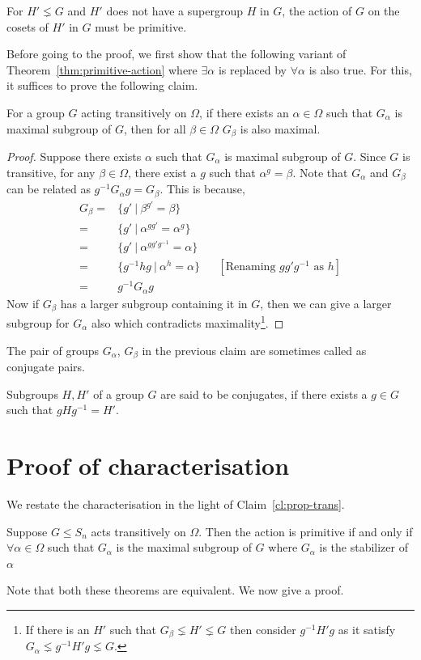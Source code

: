 \begin{corollary}
	For $H' \lneq G$ and $H'$ does not have a supergroup $H$ in $G$, the
	action of $G$ on the cosets of $H'$ in $G$ must be primitive.
\end{corollary}

Before going to the proof, we first show that the following variant of 
Theorem~\ref{thm:primitive-action} where $\exists \alpha$ is replaced by 
$\forall \alpha$ is also true. For this, it suffices to prove the following
claim.

\begin{claim}
	For a group $G$ acting transitively on $\Omega$, if there exists an
	$\alpha \in \Omega$ such that $G_\alpha$ is maximal subgroup of $G$,
	then for all $\beta \in \Omega$ $G_\beta$ is also maximal.
	\label{cl:prop-trans}
\end{claim}
\begin{proof}
	Suppose there exists $\alpha$ such that $G_\alpha$ is maximal subgroup
	of $G$. Since $G$ is transitive, for any $\beta \in \Omega$, there
	exist a $g$ such that $\alpha^g = \beta$. Note that $G_\alpha$ and
	$G_\beta$ can be related as $g^{-1}G_\alpha g =
	G_\beta$. This is because,
	\begin{align*}
		G_\beta  =&  \{ g' ~|~ \beta^{g'} = \beta \} \\
			= & \{ g' ~|~ \alpha^{gg'} = \alpha^g \} \\
			= & \{ g' ~|~ \alpha^{gg'g^{-1}} = \alpha \} \\
			= & \{ g^{-1} hg ~|~ \alpha^{h} = \alpha \} &&
			[\text{Renaming $gg'g^{-1}$ as $h$}] \\
			= & g^{-1}G_\alpha g
	\end{align*}
	Now if $G_\beta$ has a larger subgroup containing
	it in $G$, then we can give a larger
	subgroup for $G_\alpha$ also which contradicts maximality\footnote{ If
		there is an $H'$ such that $G_\beta \lneq H' \lneq G$ then
		consider $g^{-1}H'g$ as it satisfy $G_\alpha \lneq g^{-1}H'g
	\lneq G$.}. 
\end{proof}
The pair of groups $G_\alpha$, $G_\beta$ in the previous claim are sometimes
called as conjugate pairs.
\begin{definition}[Conjugates]
	Subgroups $H,H'$ of a group $G$ are said to be conjugates, if there 
	exists a $g \in G$ such that $gHg^{-1} =H'$.
\end{definition}

\section{Proof of characterisation}
We restate the characterisation in the light of Claim~\ref{cl:prop-trans}.
\begin{theorem}
	Suppose $G \le S_n$ acts transitively on $\Omega$. Then the action is
	primitive if and only if $\forall \alpha \in \Omega$ such that
	$G_{\alpha}$ is the maximal subgroup of $G$ where $G_\alpha$ is the
	stabilizer of $\alpha$
	\label{thm:primitive-action-strong}
\end{theorem}
Note that both these theorems are equivalent. We now give a proof.

